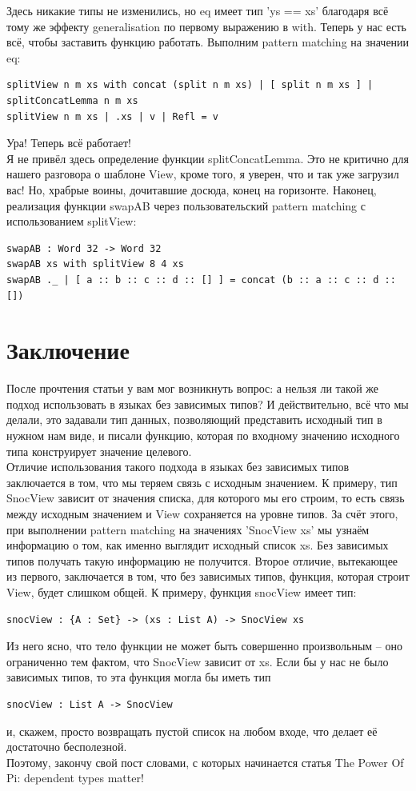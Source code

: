 \documentclass[8pt]{extarticle}
\begin{document}
Здесь никакие типы не изменились, но eq имеет тип 'ys == xs' благодаря всё тому же эффекту generalisation по первому выражению в with. Теперь у нас есть всё, чтобы заставить функцию работать. Выполним pattern matching на значении eq:
\begin{lstlisting}
splitView n m xs with concat (split n m xs) | [ split n m xs ] | splitConcatLemma n m xs
splitView n m xs | .xs | v | Refl = v
\end{lstlisting}
Ура! Теперь всё работает!\\
Я не привёл здесь определение функции splitConcatLemma. Это не критично для нашего разговора о шаблоне View, кроме того, я уверен, что и так уже загрузил вас! Но, храбрые воины, дочитавшие досюда, конец на горизонте.
Наконец, реализация функции swapAB через пользовательский pattern matching с использованием splitView:
\begin{lstlisting}
swapAB : Word 32 -> Word 32
swapAB xs with splitView 8 4 xs
swapAB ._ | [ a :: b :: c :: d :: [] ] = concat (b :: a :: c :: d :: [])
\end{lstlisting}


\section{Заключение}

После прочтения статьи у вам мог возникнуть вопрос: а нельзя ли такой же подход использовать в языках без зависимых типов? И действительно, всё что мы делали, это задавали тип данных, позволяющий представить исходный тип в нужном нам виде, и писали функцию, которая по входному значению исходного типа конструирует значение целевого.\\
Отличие использования такого подхода в языках без зависимых типов заключается в том, что мы теряем связь с исходным значением. К примеру, тип SnocView зависит от значения списка, для которого мы его строим, то есть связь между исходным значением и View сохраняется на уровне типов. За счёт этого, при выполнении pattern matching на значениях 'SnocView xs' мы узнаём информацию о том, как именно выглядит исходный список xs. Без зависимых типов получать такую информацию не получится.
Второе отличие, вытекающее из первого, заключается в том, что без зависимых типов, функция, которая строит View, будет слишком общей. К примеру, функция snocView имеет тип:
\begin{lstlisting}
snocView : {A : Set} -> (xs : List A) -> SnocView xs
\end{lstlisting}
Из него ясно, что тело функции не может быть совершенно произвольным -- оно ограниченно тем фактом, что SnocView зависит от xs. Если бы у нас не было зависимых типов, то эта функция могла бы иметь тип
\begin{lstlisting}
snocView : List A -> SnocView
\end{lstlisting}
и, скажем, просто возвращать пустой список на любом входе, что делает её достаточно бесполезной.\\
Поэтому, закончу свой пост словами, с которых начинается статья The Power Of Pi: dependent types matter!
\end{document}
